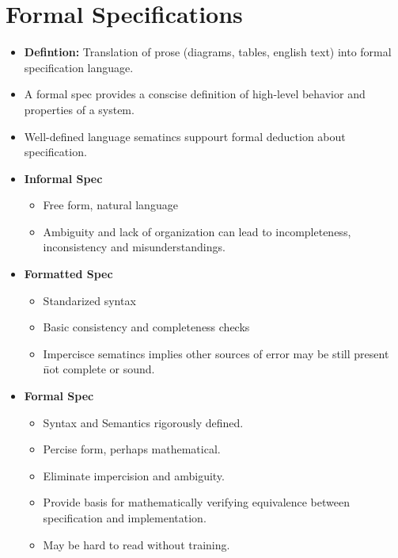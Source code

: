 \documentclass{article}
\begin{document}
    \section{Formal Specifications}
    \begin{itemize}
        \item \textbf{Defintion:} Translation of prose (diagrams, tables, english text) into formal specification language.
        \item A formal spec provides a conscise definition of high-level behavior and properties of a system.
        \item Well-defined language sematincs suppourt formal deduction about specification.
        \item \textbf{Informal Spec}\begin{itemize}
            \item Free form, natural language
            \item Ambiguity and lack of organization can lead to incompleteness, inconsistency and misunderstandings.
        \end{itemize}
        \item \textbf{Formatted Spec}\begin{itemize}
            \item Standarized syntax
            \item Basic consistency and completeness checks
            \item Impercisce sematincs implies other sources of error may be still present \= not complete or sound. 
        \end{itemize}
        \item \textbf{Formal Spec}\begin{itemize}
            \item Syntax and Semantics rigorously defined.
            \item Percise form, perhaps mathematical.
            \item Eliminate impercision and ambiguity.
            \item Provide basis for mathematically verifying equivalence between specification and implementation.
            \item May be hard to read without training.
        \end{itemize}
    \end{itemize}
\end{document}
